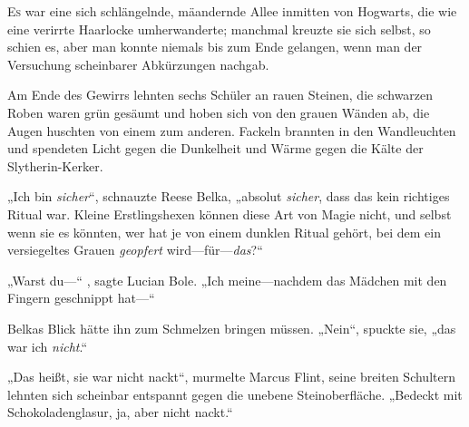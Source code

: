 
\lettrine{E}{s} war eine sich schlängelnde, mäandernde Allee inmitten von Hogwarts, die wie eine verirrte Haarlocke umherwanderte; manchmal kreuzte sie sich selbst, so schien es, aber man konnte niemals bis zum Ende gelangen, wenn man der Versuchung scheinbarer Abkürzungen nachgab.

Am Ende des Gewirrs lehnten sechs Schüler an rauen Steinen, die schwarzen Roben waren grün gesäumt und hoben sich von den grauen Wänden ab, die Augen huschten von einem zum anderen. Fackeln brannten in den Wandleuchten und spendeten Licht gegen die Dunkelheit und Wärme gegen die Kälte der Slytherin-Kerker.

„Ich bin \emph{sicher}“, schnauzte Reese Belka, „absolut \emph{sicher}, dass das kein richtiges Ritual war. Kleine Erstlingshexen können diese Art von Magie nicht, und selbst wenn sie es könnten, wer hat je von einem dunklen Ritual gehört, bei dem ein versiegeltes Grauen \emph{geopfert} wird—für—\emph{das}?“

„Warst du—“ , sagte Lucian Bole. „Ich meine—nachdem das Mädchen mit den Fingern geschnippt hat—“

Belkas Blick hätte ihn zum Schmelzen bringen müssen. „Nein“, spuckte sie, „das war ich \emph{nicht}.“

„Das heißt, sie war nicht nackt“, murmelte Marcus Flint, seine breiten Schultern lehnten sich scheinbar entspannt gegen die unebene Steinoberfläche. „Bedeckt mit Schokoladenglasur, ja, aber nicht nackt.“

